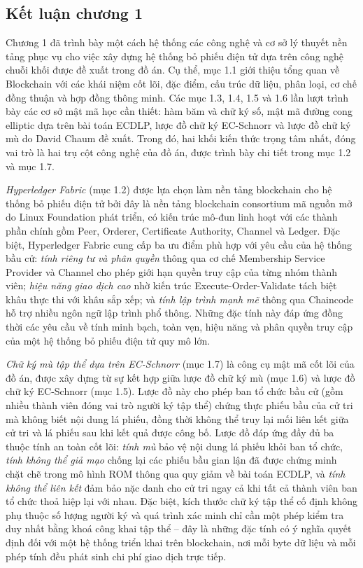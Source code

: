 \subsection{Kết luận chương 1}

Chương 1 đã trình bày một cách hệ thống các công nghệ và cơ sở lý thuyết nền tảng phục vụ cho việc xây dựng hệ thống bỏ phiếu điện tử dựa trên công nghệ chuỗi khối được đề xuất trong đồ án. Cụ thể, mục 1.1 giới thiệu tổng quan về Blockchain với các khái niệm cốt lõi, đặc điểm, cấu trúc dữ liệu, phân loại, cơ chế đồng thuận và hợp đồng thông minh. Các mục 1.3, 1.4, 1.5 và 1.6 lần lượt trình bày các cơ sở mật mã học cần thiết: hàm băm và chữ ký số, mật mã đường cong elliptic dựa trên bài toán ECDLP, lược đồ chữ ký EC-Schnorr và lược đồ chữ ký mù do David Chaum đề xuất. Trong đó, hai khối kiến thức trọng tâm nhất, đóng vai trò là hai trụ cột công nghệ của đồ án, được trình bày chi tiết trong mục 1.2 và mục 1.7.

\textit{Hyperledger Fabric} (mục 1.2) được lựa chọn làm nền tảng blockchain cho hệ thống bỏ phiếu điện tử bởi đây là nền tảng blockchain consortium mã nguồn mở do Linux Foundation phát triển, có kiến trúc mô-đun linh hoạt với các thành phần chính gồm Peer, Orderer, Certificate Authority, Channel và Ledger. Đặc biệt, Hyperledger Fabric cung cấp ba ưu điểm phù hợp với yêu cầu của hệ thống bầu cử: \textit{tính riêng tư và phân quyền} thông qua cơ chế Membership Service Provider và Channel cho phép giới hạn quyền truy cập của từng nhóm thành viên; \textit{hiệu năng giao dịch cao} nhờ kiến trúc Execute-Order-Validate tách biệt khâu thực thi với khâu sắp xếp; và \textit{tính lập trình mạnh mẽ} thông qua Chaincode hỗ trợ nhiều ngôn ngữ lập trình phổ thông. Những đặc tính này đáp ứng đồng thời các yêu cầu về tính minh bạch, toàn vẹn, hiệu năng và phân quyền truy cập của một hệ thống bỏ phiếu điện tử quy mô lớn.

\textit{Chữ ký mù tập thể dựa trên EC-Schnorr} (mục 1.7) là công cụ mật mã cốt lõi của đồ án, được xây dựng từ sự kết hợp giữa lược đồ chữ ký mù (mục 1.6) và lược đồ chữ ký EC-Schnorr (mục 1.5). Lược đồ này cho phép ban tổ chức bầu cử (gồm nhiều thành viên đóng vai trò người ký tập thể) chứng thực phiếu bầu của cử tri mà không biết nội dung lá phiếu, đồng thời không thể truy lại mối liên kết giữa cử tri và lá phiếu sau khi kết quả được công bố. Lược đồ đáp ứng đầy đủ ba thuộc tính an toàn cốt lõi: \textit{tính mù} bảo vệ nội dung lá phiếu khỏi ban tổ chức, \textit{tính không thể giả mạo} chống lại các phiếu bầu gian lận đã được chứng minh chặt chẽ trong mô hình ROM thông qua quy giảm về bài toán ECDLP, và \textit{tính không thể liên kết} đảm bảo nặc danh cho cử tri ngay cả khi tất cả thành viên ban tổ chức thoả hiệp lại với nhau. Đặc biệt, kích thước chữ ký tập thể cố định không phụ thuộc số lượng người ký và quá trình xác minh chỉ cần một phép kiểm tra duy nhất bằng khoá công khai tập thể -- đây là những đặc tính có ý nghĩa quyết định đối với một hệ thống triển khai trên blockchain, nơi mỗi byte dữ liệu và mỗi phép tính đều phát sinh chi phí giao dịch trực tiếp.

